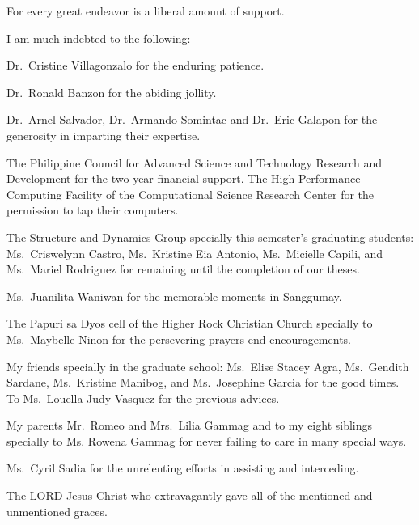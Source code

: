 \hspace{\parindent}\small For every great endeavor is a liberal amount of support.

I am much indebted to the following:

Dr.\ Cristine Villagonzalo for the enduring patience.

Dr.\ Ronald Banzon for the abiding jollity.

Dr.\ Arnel Salvador, Dr.\ Armando Somintac and Dr.\ Eric Galapon 
for the generosity in imparting their expertise.

The Philippine Council for Advanced Science and Technology Research and Development for the two-year financial support. The High Performance Computing Facility of the Computational Science Research Center for the permission to tap their computers.

The Structure and Dynamics Group specially this semester's graduating students:
Ms.\ Criswelynn Castro, Ms.\ Kristine Eia Antonio, Ms.\ Micielle Capili, and Ms.\ Mariel Rodriguez for remaining until the completion of our theses.

Ms.\ Juanilita Waniwan for the memorable moments in Sanggumay.

The Papuri sa Dyos cell of the Higher Rock Christian Church specially to Ms.\ Maybelle Ninon for the persevering prayers end encouragements.

My friends specially in the graduate school: Ms.\ Elise Stacey Agra, Ms.\ Gendith Sardane, Ms.\ Kristine Manibog, and Ms.\ Josephine Garcia for the good times. To Ms.\ Louella Judy Vasquez for the previous advices.

My parents Mr.\ Romeo and Mrs.\ Lilia Gammag and to my eight siblings specially to Ms. Rowena Gammag for never failing to care in many special ways.  

Ms.\ Cyril Sadia for the unrelenting efforts in assisting and interceding.

The LORD Jesus Christ who extravagantly gave all of the mentioned and unmentioned graces.